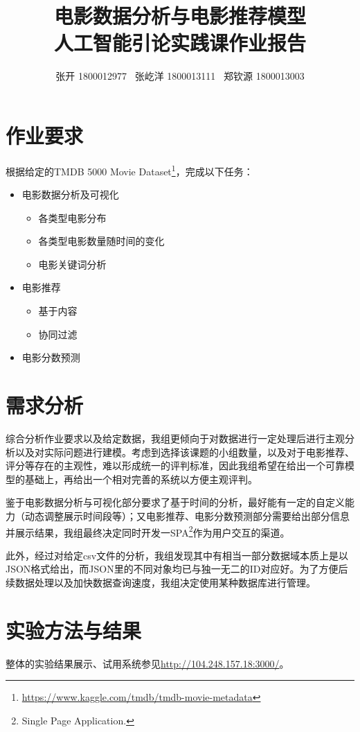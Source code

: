 \documentclass[UTF8]{ctexart}
\title{
  电影数据分析与电影推荐模型\\
  \large 人工智能引论实践课作业报告}
\author{张开 1800012977 \ 张屹洋 1800013111 \ 郑钦源 1800013003}
\begin{document}
\maketitle
\tableofcontents
\newpage

\section{作业要求}
\par 根据给定的TMDB 5000 Movie Dataset\footnote{\href{https://www.kaggle.com/tmdb/tmdb-movie-metadata}{https://www.kaggle.com/tmdb/tmdb-movie-metadata}}，完成以下任务：
\begin{itemize}
  \item 电影数据分析及可视化
  \begin{itemize}
    \item 各类型电影分布
    \item 各类型电影数量随时间的变化
    \item 电影关键词分析
  \end{itemize}
  \item 电影推荐
  \begin{itemize}
    \item 基于内容
    \item 协同过滤
  \end{itemize}
  \item 电影分数预测
\end{itemize}

\section{需求分析}
\par 综合分析作业要求以及给定数据，我组更倾向于对数据进行一定处理后进行主观分析以及对实际问题进行建模。考虑到选择该课题的小组数量，以及对于电影推荐、评分等存在的主观性，难以形成统一的评判标准，因此我组希望在给出一个可靠模型的基础上，再给出一个相对完善的系统以方便主观评判。
\par 鉴于电影数据分析与可视化部分要求了基于时间的分析，最好能有一定的自定义能力（动态调整展示时间段等）；又电影推荐、电影分数预测部分需要给出部分信息并展示结果，我组最终决定同时开发一SPA\footnote{Single Page Application.}作为用户交互的渠道。
\par 此外，经过对给定csv文件的分析，我组发现其中有相当一部分数据域本质上是以JSON格式给出，而JSON里的不同对象均已与独一无二的ID对应好。为了方便后续数据处理以及加快数据查询速度，我组决定使用某种数据库进行管理。

\section{实验方法与结果}
\par 整体的实验结果展示、试用系统参见\href{http://104.248.157.18:3000/}{http://104.248.157.18:3000/}。
\end{document}
